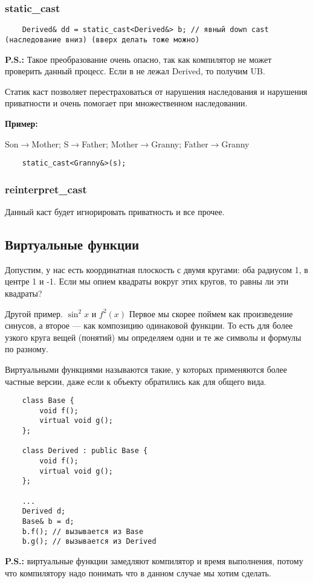 \documentclass[12pt]{article}
\newcommand{\ps}{\textbf{P.S.: }}
\begin{document}
\subsubsection{static\_cast}

\begin{lstlisting}
	Derived& dd = static_cast<Derived&> b; // явный down cast (наследование вниз) (вверх делать тоже можно)
\end{lstlisting}

\ps Такое преобразование очень опасно, так как компилятор не может проверить данный процесс. Если в не лежал Derived, то получим UB. 


Статик каст позволяет перестраховаться от нарушения наследования и нарушения приватности и очень помогает при множественном наследовании. 

\textbf{Пример:}

\begin{center}
	Son$\rightarrow$Mother; S$\rightarrow$Father; Mother$\rightarrow$Granny; Father$\rightarrow$Granny
\end{center}

\begin{lstlisting}
	static_cast<Granny&>(s);
\end{lstlisting}

\subsubsection{reinterpret\_cast}

Данный каст будет игнорировать приватность и все прочее. 



\subsection{Виртуальные функции}

Допустим, у нас есть координатная плоскость с двумя кругами: оба радиусом 1, в центре 1 и -1. Если мы опием квадраты вокруг этих кругов, то равны ли эти квадраты?

Другой пример. $\sin^2{x}$ и $f^2(x)$ Первое мы скорее поймем как произведение синусов, а второе --- как композицию одинаковой функции. То есть для более узкого круга вещей (понятий) мы определяем одни и те же символы и формулы по разному. 

Виртуальными функциями называются такие, у которых применяются более частные версии, даже если к объекту обратились как для общего вида. 

\begin{lstlisting}
	class Base {
		void f();
		virtual void g();	
	};
	
	class Derived : public Base {
		void f();
		virtual void g();
	};
	
	...
	Derived d;
	Base& b = d;
	b.f(); // вызывается из Base
	b.g(); // вызывается из Derived
\end{lstlisting}

\ps виртуальные функции замедляют компилятор и время выполнения, потому что компилятору надо понимать что в данном случае мы хотим сделать. 
\end{document}
